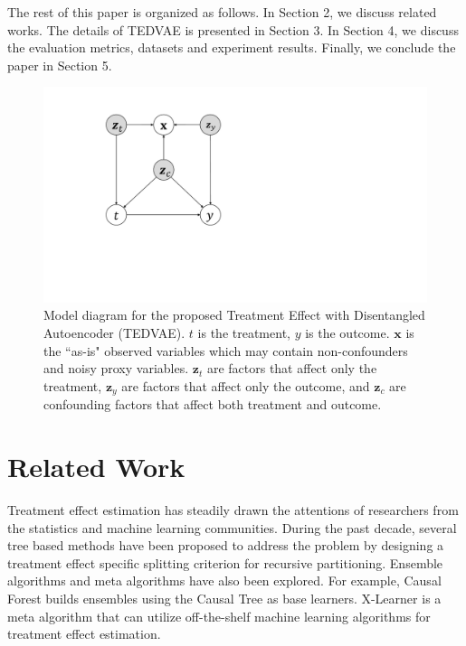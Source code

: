 \documentclass[letterpaper]{article} %
\begin{document}
The rest of this paper is organized as follows. In Section 2, we discuss related works. The details of TEDVAE is presented in Section 3. In Section 4, we discuss the evaluation metrics, datasets and experiment results. Finally, we conclude the paper in Section 5.


\begin{figure}[!t]
	\centering
	\includegraphics[width = 0.9\columnwidth]{figures.pdf}
	\caption{Model diagram for the proposed Treatment Effect with Disentangled Autoencoder (TEDVAE). $t$ is the treatment, $y$ is the outcome. $\mathbf{x}$ is the ``as-is" observed variables which may contain non-confounders and noisy proxy variables.
		$\mathbf{z}_t$ are factors that affect only the treatment, $\mathbf{z}_y$ are factors that affect only the outcome, and $\mathbf{z}_c$ are confounding factors that affect both treatment and outcome.
	}
	\label{illustration}
\end{figure}
\section*{Related Work}
Treatment effect estimation has steadily drawn the attentions of researchers from the statistics and machine learning communities. During the past decade,
several tree based methods \cite {Su2009,Athey2015,Zhang2017,Zhang2018} have been proposed to address the problem by designing a treatment effect specific splitting criterion for recursive partitioning.
Ensemble algorithms and meta algorithms \cite{Kuenzel2019,Wager2018} have also been explored. For example, Causal Forest\cite{Wager2018} builds ensembles using the Causal Tree \cite{Athey2015} as base learners. X-Learner \cite{Kuenzel2019} is a meta algorithm that can utilize off-the-shelf machine learning algorithms for treatment effect estimation.
\end{document}
